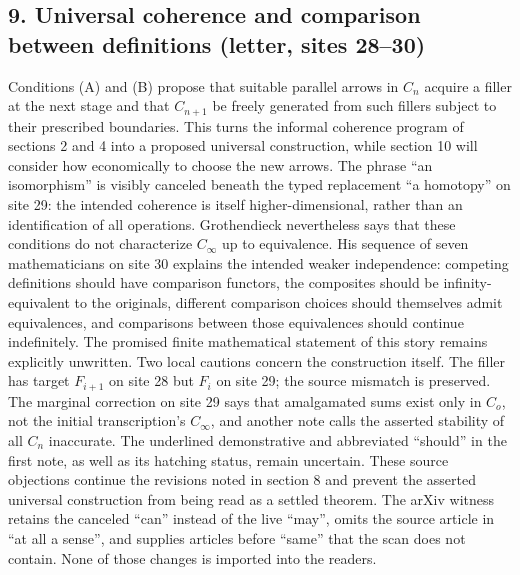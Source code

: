 \documentclass[10pt,oneside]{book}
\begin{document}
\subsection*{9. Universal coherence and comparison between definitions (letter, sites 28--30)}
Conditions (A) and (B) propose that suitable parallel arrows in $C_n$ acquire a filler at the next stage and that $C_{n+1}$ be freely generated from such fillers subject to their prescribed boundaries. This turns the informal coherence program of sections 2 and 4 into a proposed universal construction, while section 10 will consider how economically to choose the new arrows. The phrase ``an isomorphism'' is visibly canceled beneath the typed replacement ``a homotopy'' on site 29: the intended coherence is itself higher-dimensional, rather than an identification of all operations. Grothendieck nevertheless says that these conditions do not characterize $C_\infty$ up to equivalence. His sequence of seven mathematicians on site 30 explains the intended weaker independence: competing definitions should have comparison functors, the composites should be infinity-equivalent to the originals, different comparison choices should themselves admit equivalences, and comparisons between those equivalences should continue indefinitely. The promised finite mathematical statement of this story remains explicitly unwritten. Two local cautions concern the construction itself. The filler has target $F_{i+1}$ on site 28 but $F_i$ on site 29; the source mismatch is preserved. The marginal correction on site 29 says that amalgamated sums exist only in $C_o$, not the initial transcription's $C_\infty$, and another note calls the asserted stability of all $C_n$ inaccurate. The underlined demonstrative and abbreviated ``should'' in the first note, as well as its hatching status, remain uncertain. These source objections continue the revisions noted in section 8 and prevent the asserted universal construction from being read as a settled theorem. The arXiv witness retains the canceled ``can'' instead of the live ``may'', omits the source article in ``at all a sense'', and supplies articles before ``same'' that the scan does not contain. None of those changes is imported into the readers.
\end{document}
